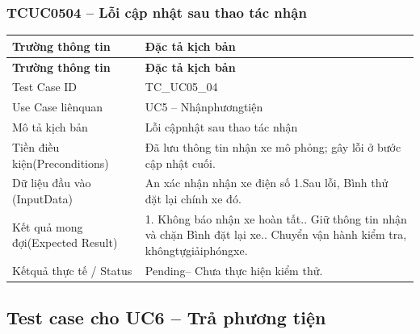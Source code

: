 \subsubsection{TCUC0504 – Lỗi cập nhật sau thao tác nhận}
\begin{longtable}{|L{0.24\textwidth}|L{0.70\textwidth}|}
\hline
\textbf{Trường thông tin} & \textbf{Đặc tả kịch bản} \\
\hline
\endfirsthead
\hline
\textbf{Trường thông tin} & \textbf{Đặc tả kịch bản} \\
\hline
\endhead
Test Case ID & TC\_UC05\_04 \\
\hline
Use Case liênquan & UC5 – Nhậnphươngtiện \\
\hline
Mô tả kịch bản & Lỗi cậpnhật sau thao tác nhận \\
\hline
Tiền điều kiện\newline (Preconditions) & Đã lưu thông tin nhận xe mô phỏng; gây lỗi ở bước cập nhật cuối. \\
\hline
Dữ liệu đầu vào (Input\newline Data) & An xác nhận nhận xe điện số 1.\newline Sau lỗi, Bình thử đặt lại chính xe đó. \\
\hline
Kết quả mong đợi\newline (Expected Result) & 1. Không báo nhận xe hoàn tất.. Giữ thông tin nhận và chặn Bình đặt lại xe.. Chuyển vận hành kiểm tra, khôngtựgiảiphóngxe. \\
\hline
Kếtquả thực tế / Status & Pending– Chưa thực hiện kiểm thử. \\
\hline
\end{longtable}
\vspace{-0.5\baselineskip}
\subsection{Test case cho UC6 – Trả phương tiện}
